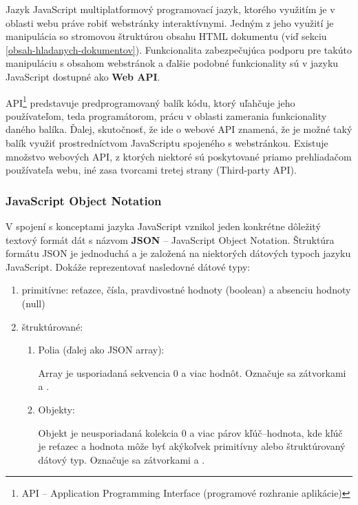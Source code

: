 Jazyk JavaScript multiplatformový programovací jazyk, ktorého využitím je v oblasti webu práve robiť webstránky interaktívnymi. 
Jedným z jeho využití je manipulácia so stromovou štruktúrou obsahu HTML dokumentu (viď sekciu \ref{obsah-hladanych-dokumentov}).
Funkcionalita zabezpečujúca podporu pre takúto manipuláciu s obsahom webstránok a ďalšie podobné funkcionality sú v jazyku JavaScript dostupné ako \textbf{Web API}.

API\footnote{API -- Application Programming Interface (programové rozhranie aplikácie)} predstavuje predprogramovaný balík kódu, ktorý uľahčuje jeho používateľom, teda programátorom, prácu v oblasti zamerania funkcionality daného balíka.
Ďalej, skutočnosť, že ide o webové API znamená, že je možné taký balík využiť prostredníctvom JavaScriptu spojeného s webstránkou.
Existuje množstvo webových API, z ktorých niektoré sú poskytované priamo prehliadačom používateľa webu, iné zasa tvorcami tretej strany (Third-party API).


\subsubsection{JavaScript Object Notation}
\label{json}

V spojení s konceptami jazyka JavaScript vznikol jeden konkrétne dôležitý textový formát dát s názvom \textbf{JSON} -- JavaScript Object Notation.
Štruktúra formátu JSON je jednoduchá a je založená na niektorých dátových typoch jazyku JavaScript.
Dokáže reprezentovať nasledovné dátové typy:
\begin{enumerate}
    \item primitívne: reťazce, čísla, pravdivostné hodnoty (boolean) a absenciu hodnoty (null)
    
    \item štruktúrované: 
    \begin{enumerate}
        \item Polia (ďalej ako JSON array):

        Array je usporiadaná sekvencia 0 a viac hodnôt. Označuje sa zátvorkami \code{[} a \code{]}. 

        \item Objekty:

        Objekt je neusporiadaná kolekcia 0 a viac párov kľúč--hodnota, kde kľúč je reťazec
        a hodnota môže byť akýkoľvek primitívny alebo štruktúrovaný dátový typ.
        Označuje sa zátvorkami \code{\{} a \code{\}}.
    \end{enumerate}
\end{enumerate}

